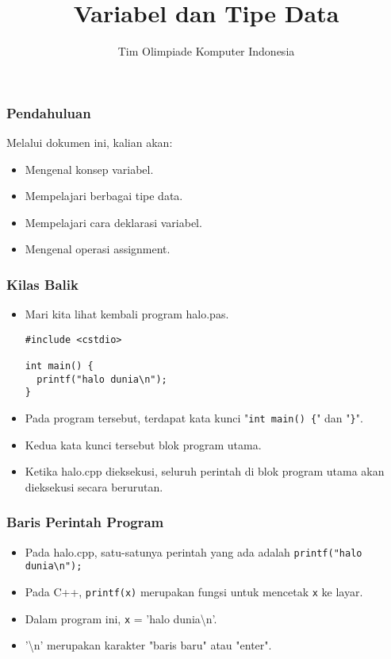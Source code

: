 

\title{Variabel dan Tipe Data}
\author{Tim Olimpiade Komputer Indonesia}
\date{}



\begin{frame}
\titlepage
\end{frame}

\begin{frame}
\frametitle{Pendahuluan}
Melalui dokumen ini, kalian akan:
\begin{itemize}
  \item Mengenal konsep variabel.
  \item Mempelajari berbagai tipe data.
  \item Mempelajari cara deklarasi variabel.
  \item Mengenal operasi assignment.
\end{itemize}
\end{frame}

\begin{frame}[fragile]
\frametitle{Kilas Balik}
\begin{itemize}
  \item Mari kita lihat kembali program halo.pas.
  \begin{lstlisting}
#include <cstdio>

int main() {
  printf("halo dunia\n");
}\end{lstlisting}
  \item Pada program tersebut, terdapat kata kunci "\texttt{int main() \{}" dan "\texttt{\}}".
  \item Kedua kata kunci tersebut blok program utama.
  \item Ketika halo.cpp dieksekusi, seluruh perintah di blok program utama akan dieksekusi secara berurutan.
\end{itemize}
\end{frame}

\begin{frame}
\frametitle{Baris Perintah Program}
\begin{itemize}
  \item Pada halo.cpp, satu-satunya perintah yang ada adalah \texttt{printf("halo dunia\textbackslash n");}
  \item Pada C++, \texttt{printf(x)} merupakan fungsi untuk mencetak \texttt{x} ke layar. 
  \item Dalam program ini, \texttt{x} = 'halo dunia\textbackslash n'.
  \item '\textbackslash n' merupakan karakter "baris baru" atau "enter".
\end{itemize}
\end{frame}

